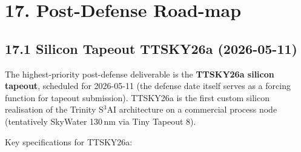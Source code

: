 
\section{17. Post-Defense Road-map}\label{sec:roadmap}

\subsection{17.1 Silicon Tapeout TTSKY26a (2026-05-11)}\label{sec:tapeout}

The highest-priority post-defense deliverable is the
\textbf{TTSKY26a silicon tapeout}, scheduled for 2026-05-11 (the defense
date itself serves as a forcing function for tapeout submission).
TTSKY26a is the first custom silicon realisation of the Trinity
S${}^3$AI architecture on a commercial process node (tentatively
SkyWater 130\,nm via Tiny Tapeout 8).

Key specifications for TTSKY26a:

\begin{table}[h]
\caption{TTSKY26a silicon tapeout specifications}
\label{tab:tapeout}
\centering
{}
\end{table}

